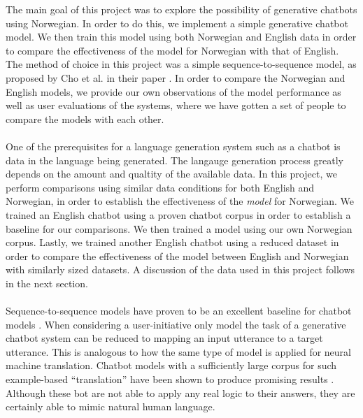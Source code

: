 \documentclass{article}
\begin{document}
The main goal of this project was to explore the possibility of generative
chatbots using Norwegian. In order to do this, we implement a simple generative
chatbot model. We then train this model using both Norwegian and English data
in order to compare the effectiveness of the model for Norwegian with that of
English. The method of choice in this project was a simple sequence-to-sequence
model, as proposed by Cho et al. in their paper \cite{Cho2014}. In order to
compare the Norwegian and English models, we provide our own observations of
the model performance as well as user evaluations of the systems, where we
have gotten a set of people to compare the models with each other.

\paragraph{}
One of the prerequisites for a language generation system such as a chatbot is
data in the language being generated. The langauge generation process greatly
depends on the amount and qualtity of the available data. In this project, we
perform comparisons using similar data conditions for both English and Norwegian,
in order to establish the effectiveness of the \emph{model} for Norwegian. We
trained an English chatbot using a proven chatbot corpus in order to establish
a baseline for our comparisons. We then trained a model using our own
Norwegian corpus. Lastly, we trained another English chatbot using a reduced
dataset in order to compare the effectiveness of the model between English and
Norwegian with similarly sized datasets. A discussion of the data used in this
project follows in the next section.

\paragraph{}
Sequence-to-sequence models have proven to be an excellent baseline for
chatbot models \cite{Vinyals2015}. When considering a user-initiative only
model the task of a generative chatbot system can be reduced to mapping an
input utterance to a target utterance. This is analogous to how the same type
of model is applied for neural machine translation. Chatbot models with a
sufficiently large corpus for such example-based ``translation'' have been
shown to produce promising results \cite{Ezquerra2018}. Although these bot are
not able to apply any real logic to their answers, they are certainly able to
mimic natural human language.
\end{document}
